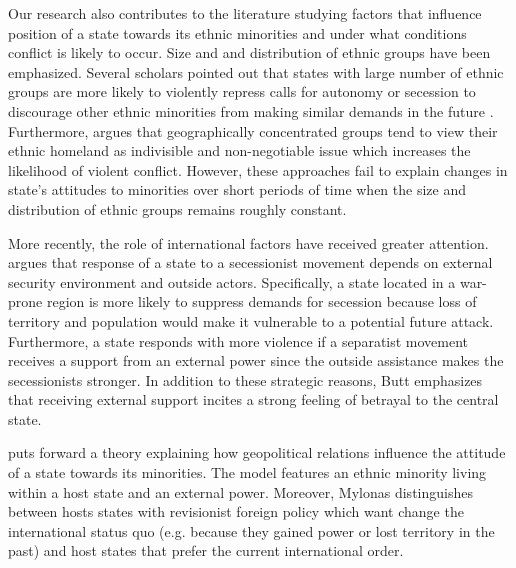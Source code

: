 Our research also contributes to the literature studying factors that influence position of a state towards its ethnic minorities and under what conditions conflict is likely to occur. Size and and distribution of ethnic groups have been emphasized. Several scholars pointed out that
states with large number of ethnic groups are more likely to violently repress calls for autonomy or secession to discourage other ethnic minorities from making similar demands in the future \citep{evera_hypotheses_1994, toft_geography_2005,walter_reputation_2009}. 
Furthermore,  \citet{toft_geography_2005} argues that geographically concentrated groups tend to view their ethnic homeland as indivisible and non-negotiable issue which increases the likelihood of violent conflict. However, these approaches fail to explain changes in state's attitudes to minorities over short periods of time when the size and distribution of ethnic groups remains roughly constant. 

More recently, the role of international factors have received greater attention.  \citet{butt_secession_2017}  argues that response of a state to a secessionist movement depends on external security environment and outside actors. Specifically, a state located in a war-prone region is more likely to suppress demands for secession because loss of territory and population would make it vulnerable  to a potential future attack. Furthermore, a state responds with more violence if a separatist movement receives a support from an external power since the outside assistance makes the secessionists stronger. In addition to these strategic reasons, Butt emphasizes that  receiving external support incites  a strong feeling of betrayal to the central state.   

\citet{mylonas_politics_2013} puts forward a theory explaining how geopolitical relations influence the attitude of a state towards its minorities. The model features an ethnic minority living within a host state and  an external power. Moreover, Mylonas distinguishes between hosts states with revisionist foreign policy which want change the international status quo (e.g. because they gained power or lost territory in the past) and host states that prefer the current international order. 

